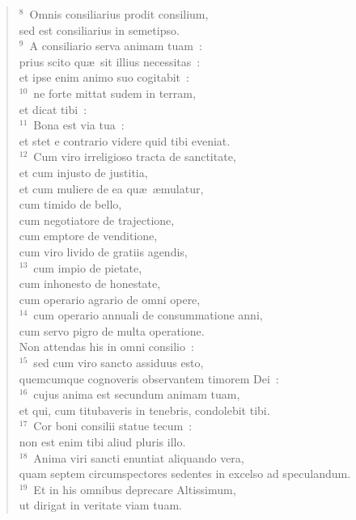 \begin{verse}${}^{8}$~Omnis consiliarius prodit consilium,\\ sed est consiliarius in semetipso.\\
${}^{9}$~A consiliario serva animam tuam~:\\ prius scito qu\ae\ sit illius necessitas~:\\ et ipse enim animo suo cogitabit~:\\
${}^{10}$~ne forte mittat sudem in terram,\\ et dicat tibi~:\\
${}^{11}$~Bona est via tua~:\\ et stet e contrario videre quid tibi eveniat.\\
${}^{12}$~Cum viro irreligioso tracta de sanctitate,\\ et cum injusto de justitia,\\ et cum muliere de ea qu\ae\ \ae mulatur,\\ cum timido de bello,\\ cum negotiatore de trajectione,\\ cum emptore de venditione,\\ cum viro livido de gratiis agendis,\\
${}^{13}$~cum impio de pietate,\\ cum inhonesto de honestate,\\ cum operario agrario de omni opere,\\
${}^{14}$~cum operario annuali de consummatione anni,\\ cum servo pigro de multa operatione.\\ Non attendas his in omni consilio~:\\
${}^{15}$~sed cum viro sancto assiduus esto,\\ quemcumque cognoveris observantem timorem Dei~:\\
${}^{16}$~cujus anima est secundum animam tuam,\\ et qui, cum titubaveris in tenebris, condolebit tibi.\\
${}^{17}$~Cor boni consilii statue tecum~:\\ non est enim tibi aliud pluris illo.\\
${}^{18}$~Anima viri sancti enuntiat aliquando vera,\\ quam septem circumspectores sedentes in excelso ad speculandum.\\
${}^{19}$~Et in his omnibus deprecare Altissimum,\\ ut dirigat in veritate viam tuam.\end{verse}


